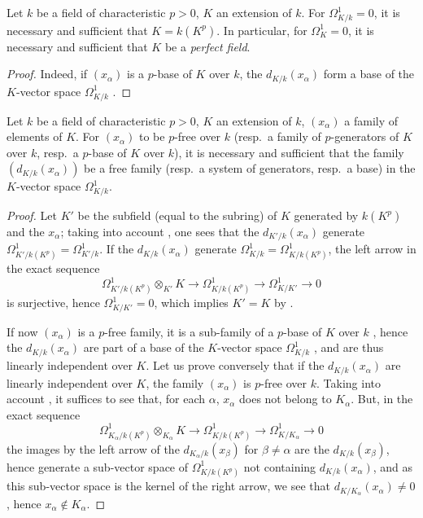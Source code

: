 \begin{corollary}[21.4.4]
\label{0.21.4.4}
Let $k$ be a field of characteristic $p>0$, $K$ an extension of $k$.
For $\Omega^1_{K/k}=0$, it is necessary and sufficient that $K=k(K^p)$.
In particular, for $\Omega^1_K=0$, it is necessary and sufficient that $K$ be a \emph{perfect field}.
\end{corollary}

\begin{proof}
Indeed, if $(x_\alpha)$ is a $p$-base of $K$ over $k$, the $d_{K/k}(x_\alpha)$ form a base of the $K$-vector space $\Omega^1_{K/k}$ .
\end{proof}

\begin{theorem}[21.4.5]
\label{0.21.4.5}
Let $k$ be a field of characteristic $p>0$, $K$ an extension of $k$, $(x_\alpha)$ a family of elements of $K$.
For $(x_\alpha)$ to be $p$-free over $k$ \textup{(}\textup{resp.}\ a family of $p$-generators of $K$ over $k$, \textup{resp.}\ a $p$-base of $K$ over $k$\textup{)}, it is necessary and sufficient that the family $(d_{K/k}(x_\alpha))$ be a free family \textup{(}\textup{resp.}\ a system of generators, \textup{resp.}\ a base\textup{)} in the $K$-vector space $\Omega^1_{K/k}$.
\end{theorem}

\begin{proof}
Let $K'$ be the subfield (equal to the subring) of $K$ generated by $k(K^p)$ and the $x_\alpha$; taking into account , one sees that the $d_{K'/k}(x_\alpha)$ generate $\Omega^1_{K'/k(K^p)}=\Omega^1_{K'/k}$.
If the $d_{K/k}(x_\alpha)$ generate $\Omega^1_{K/k}=\Omega^1_{K/k(K^p)}$, the left arrow in the exact sequence 
\[
  \Omega^1_{K'/k(K^p)}\otimes_{K'}K\to\Omega^1_{K/k(K^p)}\to\Omega^1_{K/K'}\to 0
\]
is surjective, hence $\Omega^1_{K/K'}=0$, which implies $K'=K$ by .

If now $(x_\alpha)$ is a $p$-free family, it is a sub-family of a $p$-base of $K$ over $k$ , hence the $d_{K/k}(x_\alpha)$ are part of a base of the $K$-vector space $\Omega^1_{K/k}$ , and are thus linearly independent over $K$.
Let us prove conversely that if the $d_{K/k}(x_\alpha)$ are linearly independent over $K$, the family $(x_\alpha)$ is $p$-free over $k$.
Taking into account , it suffices to see that, for each $\alpha$, $x_\alpha$ does not belong to $K_\alpha$.
But, in the exact sequence
\[
  \Omega^1_{K_\alpha/k(K^p)}\otimes_{K_\alpha} K\to\Omega^1_{K/k(K^p)}\to\Omega^1_{K/K_\alpha}\to 0
\]
the images by the left arrow of the $d_{K_\alpha/k}(x_\beta)$ for $\beta\neq\alpha$ are the $d_{K/k}(x_\beta)$, hence generate a sub-vector space of $\Omega^1_{K/k(K^p)}$ not containing $d_{K/k}(x_\alpha)$, and as this sub-vector space is the kernel of the right arrow, we see that $d_{K/K_\alpha}(x_\alpha)\neq 0$, hence $x_\alpha\notin K_\alpha$.
\end{proof}

